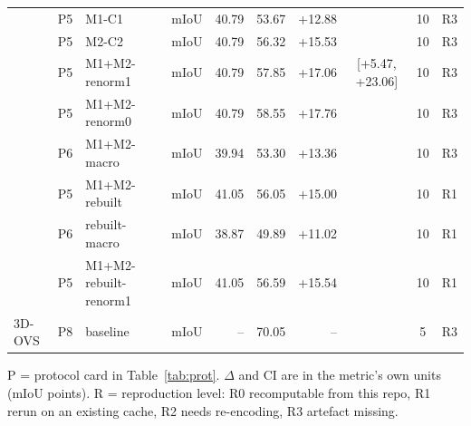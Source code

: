 \begin{table}[t]
\begin{tabular}{llllrrrccl}
 & P5 & M1-C1 & mIoU & 40.79 & 53.67 & +12.88 &  & 10 & R3 \\
 & P5 & M2-C2 & mIoU & 40.79 & 56.32 & +15.53 &  & 10 & R3 \\
 & P5 & M1+M2-renorm1 & mIoU & 40.79 & 57.85 & +17.06 & [+5.47, +23.06] & 10 & R3 \\
 & P5 & M1+M2-renorm0 & mIoU & 40.79 & 58.55 & +17.76 &  & 10 & R3 \\
 & P6 & M1+M2-macro & mIoU & 39.94 & 53.30 & +13.36 &  & 10 & R3 \\
 & P5 & M1+M2-rebuilt & mIoU & 41.05 & 56.05 & +15.00 &  & 10 & R1 \\
 & P6 & rebuilt-macro & mIoU & 38.87 & 49.89 & +11.02 &  & 10 & R1 \\
 & P5 & M1+M2-rebuilt-renorm1 & mIoU & 41.05 & 56.59 & +15.54 &  & 10 & R1 \\
3D-OVS & P8 & baseline & mIoU & -- & 70.05 & -- &  & 5 & R3 \\
\bottomrule
\end{tabular}
\par\smallskip\footnotesize P = protocol card in Table~\ref{tab:prot}. $\Delta$ and CI are in the metric's own units (mIoU points). R = reproduction level: R0 recomputable from this repo, R1 rerun on an existing cache, R2 needs re-encoding, R3 artefact missing.
\end{table}
